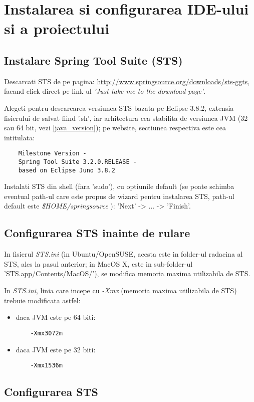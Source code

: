 \section{Instalarea si configurarea IDE-ului si a proiectului}

\subsection{Instalare Spring Tool Suite (STS)}
Descarcati STS de pe pagina:
\url{http://www.springsource.org/downloads/sts-ggts},
facand click direct pe link-ul \emph{'Just take me to the download page'}.

Alegeti pentru descarcarea versiunea STS bazata pe Eclipse 3.8.2, extensia
fisierului de salvat fiind '.sh', iar arhitectura cea stabilita de versiunea
JVM (32 sau 64 bit, vezi \ref{java_version}); pe website, sectiunea respectiva
este cea intitulata:
\begin{verbatim}
	Milestone Version - 
	Spring Tool Suite 3.2.0.RELEASE - 
	based on Eclipse Juno 3.8.2
\end{verbatim}

Instalati STS din shell (fara 'sudo'), cu optiunile default (se poate
schimba eventual path-ul care este propus de wizard pentru instalarea STS,
path-ul default este \emph{\$HOME/springsource} ):
'Next' -> ... -> 'Finish'.

\subsection{Configurarea STS inainte de rulare}
In fisierul \emph{STS.ini} (in Ubuntu/OpenSUSE, acesta este in folder-ul
radacina al STS, ales la pasul anterior; in MacOS X, este in sub-folder-ul
'STS.app/Contents/MacOS/'), se modifica memoria maxima utilizabila de STS.

In \emph{STS.ini}, linia care incepe cu \emph{-Xmx} 
(memoria maxima utilizabila de STS) 
trebuie modificata astfel:
\begin{itemize} 
\item daca JVM este pe 64 biti:
\begin{lstlisting}
	-Xmx3072m
\end{lstlisting}
\item daca JVM este pe 32 biti:
\begin{lstlisting}
	-Xmx1536m
\end{lstlisting}
\end{itemize}

\subsection{Configurarea STS}

